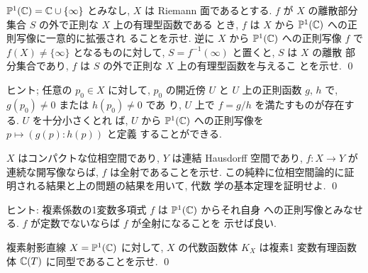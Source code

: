 \documentclass[12pt,twoside]{jarticle}
\def\C{{\Bbb C}} %
\def\P{{\Bbb P}}
\begin{document}
\begin{question}[有理型函数と射影直線への正則写像の関係]\qstar{*}
  $\P^1(\C)=\C\cup\{\infty\}$ とみなし, %
  $X$ は Riemann 面であるとする. %
  $f$ が $X$ の離散部分集合 $S$ の外で正則な $X$ 上の有理型函数である
  とき, $f$ は $X$ から $\P^1(\C)$ への正則写像に一意的に拡張され
  ることを示せ. %
  逆に $X$ から $\P^1(\C)$ への正則写像 $f$ で $f(X) \ne \{\infty\}$ 
  となるものに対して,  $S=f^{-1}(\infty)$ と置くと, $S$ は $X$ の離散
  部分集合であり, $f$ は $S$ の外で正則な $X$ 上の有理型函数を与えるこ
  とを示せ. %
  \qed
\end{question}

\noindent ヒント; 任意の $p_0\in X$ に対して, $p_0$ の開近傍 $U$ と %
$U$ 上の正則函数 $g$, $h$ で, $g(p_0)\ne0$ または $h(p_0)\ne0$ であ
り, $U$ 上で $f = g/h$ を満たすものが存在する. $U$ を十分小さくとれ
ば, $U$ から $\P^1(\C)$ への正則写像を $p \mapsto (g(p):h(p))$ と定義
することができる.

\begin{question}
  $X$ はコンパクトな位相空間であり,  $Y$ は連結 Hausdorff 空間であり, 
  $f : X \to Y$ が連続な開写像ならば, $f$ は全射であることを示せ. 
  この純粋に位相空間論的に証明される結果と上の問題の結果を用いて, 代数
  学の基本定理を証明せよ. \qed
\end{question}

\noindent ヒント: 複素係数の1変数多項式 $f$ は $\P^1(\C)$ からそれ自身
への正則写像とみなせる. $f$ が定数でないならば $f$ が全射になることを
示せば良い.

\begin{question}\qstar{*}
  複素射影直線 $X = \P^1(\C)$ に対して, $X$ の代数函数体 $K_X$ は複素1
  変数有理函数体 $\C(T)$ に同型であることを示せ. \qed
\end{question}
\end{document}
